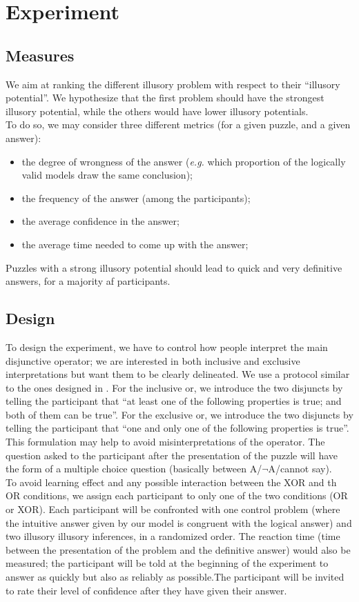 \documentclass[french]{article}
\begin{document}
\section{Experiment}
\subsection{Measures}
We aim at ranking the different illusory problem with respect to their ``illusory potential''. We hypothesize that the first problem should have the strongest illusory potential, while the others would have lower illusory potentials.\\
To do so, we may consider three different metrics (for a given puzzle, and a given answer):
\begin{itemize}
	\item the degree of wrongness of the answer (\textit{e.g.} which proportion of the logically valid models draw the same conclusion);
	\item the frequency of the answer (among the participants);
	\item the average confidence in the answer;
	\item the average time needed to come up with the answer;
\end{itemize}
Puzzles with a strong illusory potential should lead to quick and very definitive answers, for a majority af participants.
\subsection{Design}
To design the experiment, we have to control how people interpret the main disjunctive operator; we are interested in both inclusive and exclusive interpretations but want them to be clearly delineated. We use a protocol similar to the ones designed in \cite{johnsonlaird1999, khemlani2009}. For the inclusive or, we introduce the two disjuncts by telling the participant that ``at least one of the following properties is true; and both of them can be true''. For the exclusive or, we introduce the two disjuncts by telling the participant that ``one and only one of the following properties is true''. This formulation may help to avoid misinterpretations of the operator. The question asked to the participant after the presentation of the puzzle will have the form of a multiple choice question (basically between A/$\neg$A/cannot say).\\
To avoid learning effect and any possible interaction between the XOR and th OR conditions, we assign each participant to only one of the two conditions (OR or XOR). Each participant will be confronted with one control problem (where the intuitive answer given by our model is congruent with the logical answer) and two illusory illusory inferences, in a randomized order. The reaction time (time between the presentation of the problem and the definitive answer) would also be measured; the participant will be told at the beginning of the experiment to answer as quickly but also as reliably as possible.The participant will be invited to rate their level of confidence after they have given their answer. 
\end{document}
